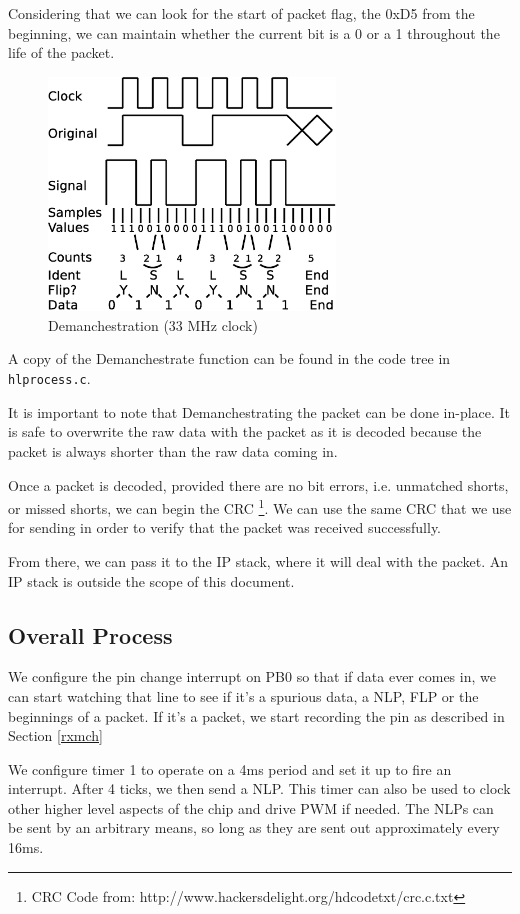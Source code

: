 \documentclass[13pt]{ltxdoc}
\begin{document}
Considering that we can look for the start of packet flag, the 0xD5 from the beginning, we can maintain
whether the current bit is a 0 or a 1 throughout the life of the packet.

\begin{figure}
    \centering
    \includegraphics[width=3.0in]{demanchester}
    \caption{Demanchestration (33 MHz clock)}
    \label{demanchester}
\end{figure}

A copy of the Demanchestrate function can be found in the code tree in \texttt{hlprocess.c}.

It is important to note that Demanchestrating the packet can be done in-place.  It is
safe to overwrite the raw data with the packet as it is decoded because the packet is always shorter
than the raw data coming in.

Once a packet is decoded, provided there are no bit errors, i.e. unmatched shorts, or missed
shorts, we can begin the CRC \footnote{CRC Code from: http://www.hackersdelight.org/hdcodetxt/crc.c.txt}.  We can use the same CRC that we use for sending in order to verify that the packet
was received successfully.

From there, we can pass it to the IP stack, where it will deal with the packet.  An IP 
stack is outside the scope of this document.

\subsection{Overall Process}
We configure the pin change interrupt on PB0 so that if data ever comes in, we can start watching that line to see if it's a spurious data, a NLP, FLP or the beginnings of a packet. 
If it's a packet, we start recording the pin as described in Section \ref{rxmch}

We configure timer 1 to operate on a 4ms period and set it up to fire an interrupt. After 4 ticks,
we then send a NLP.  This timer can also be used to clock other higher level aspects
of the chip and drive PWM if needed.  The NLPs can be sent by an arbitrary means, so long as they are
sent out approximately every 16ms.
\end{document}
